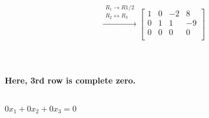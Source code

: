\documentclass[15pt]{article}
\begin{document}
  \\
  \[
 \xrightarrow{\substack{R_1 \rightarrow R1/2 \\ R_2 \leftrightarrow R_3}}
\left[\begin{array}{rrr|r}
 1 & 0 & -2 & 8 \\
 0 & 1 &  1 & -9 \\
 0 & 0 &  0 & 0 \\

  \end{array}\right]
  \]\\
  \\
  \\
\textbf{Here, 3rd row is complete zero.} \\
\\
\centerline{$ 0x_1 + 0x_2 + 0x_3 =0 $}\\
\end{document}

